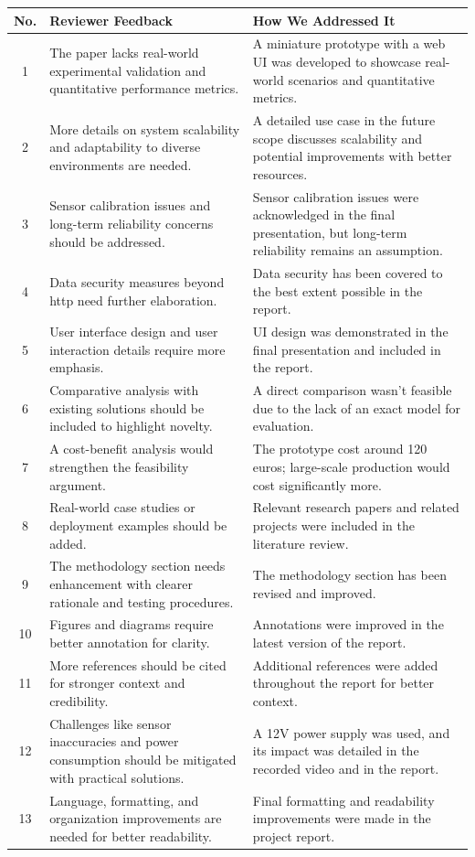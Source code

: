 \documentclass[a4paper]{scrartcl}
\begin{document}
\begin{longtable}{|c|p{6cm}|p{6cm}|}
    \hline
    \textbf{No.} & \textbf{Reviewer Feedback} & \textbf{How We Addressed It} \\ 
    \hline
    1 & The paper lacks real-world experimental validation and quantitative performance metrics. & A miniature prototype with a web UI was developed to showcase real-world scenarios and quantitative metrics. \\ 
    \hline
    2 & More details on system scalability and adaptability to diverse environments are needed. & A detailed use case in the future scope discusses scalability and potential improvements with better resources. \\ 
    \hline
    3 & Sensor calibration issues and long-term reliability concerns should be addressed. & Sensor calibration issues were acknowledged in the final presentation, but long-term reliability remains an assumption. \\ 
    \hline
    4 & Data security measures beyond http need further elaboration. & Data security has been covered to the best extent possible in the report. \\ 
    \hline
    5 & User interface design and user interaction details require more emphasis. & UI design was demonstrated in the final presentation and included in the report. \\ 
    \hline
    6 & Comparative analysis with existing solutions should be included to highlight novelty. & A direct comparison wasn’t feasible due to the lack of an exact model for evaluation. \\ 
    \hline
    7 & A cost-benefit analysis would strengthen the feasibility argument. & The prototype cost around 120 euros; large-scale production would cost significantly more. \\ 
    \hline
    8 & Real-world case studies or deployment examples should be added. & Relevant research papers and related projects were included in the literature review. \\ 
    \hline
    9 & The methodology section needs enhancement with clearer rationale and testing procedures. & The methodology section has been revised and improved. \\ 
    \hline
    10 & Figures and diagrams require better annotation for clarity. & Annotations were improved in the latest version of the report. \\ 
    \hline
    11 & More references should be cited for stronger context and credibility. & Additional references were added throughout the report for better context. \\ 
    \hline
    12 & Challenges like sensor inaccuracies and power consumption should be mitigated with practical solutions. & A 12V power supply was used, and its impact was detailed in the recorded video and in the report. \\ 
    \hline
    13 & Language, formatting, and organization improvements are needed for better readability. & Final formatting and readability improvements were made in the project report. \\ 
    \hline
\end{longtable}
\end{document}
